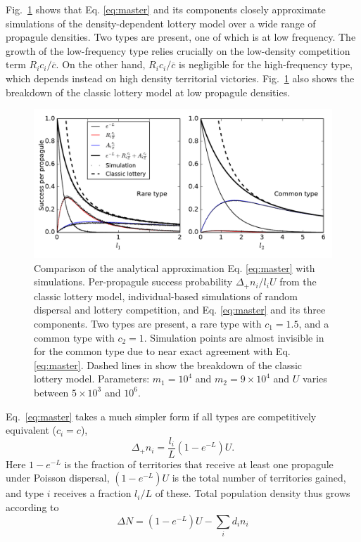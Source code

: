 \documentclass[11pt]{article}
\begin{document}
Fig.~\ref{fig:simcomp} shows that Eq. \eqref{eq:master} and its components closely approximate simulations of the density-dependent lottery model over a wide range of propagule densities. Two types are present, one of which is at low frequency. The growth of the low-frequency type relies crucially on the low-density competition term $R_i c_i/\overline{c}$. On the other hand, $R_i c_i/\overline{c}$ is negligible for the high-frequency type, which depends instead on high density territorial victories. Fig.~\ref{fig:simcomp} also shows the breakdown of the classic lottery model at low propagule densities.

\begin{figure}
\centering
\includegraphics[scale=0.8]{simulationcomparison.pdf}
\caption{\label{fig:simcomp} Comparison of the analytical approximation Eq. \eqref{eq:master} with simulations. Per-propagule success probability $\Delta_+ n_i/l_i U$ from the classic lottery model, individual-based simulations of random dispersal and lottery competition, and Eq. \eqref{eq:master} and its three components. Two types are present, a rare type with $c_1=1.5$, and a common type with $c_2=1$. Simulation points are almost invisible in for the common type due to near exact agreement with Eq. \eqref{eq:master}. Dashed lines in show the breakdown of the classic lottery model. Parameters: $m_1=10^4$ and $m_2=9\times 10^4$ and $U$ varies between $5\times 10^3$ and $10^6$.} 
\end{figure}

Eq.~\eqref{eq:master} takes a much simpler form if all types are competitively equivalent ($c_i=c$),
\begin{equation}
\Delta_+ n_i = \frac{l_i}{L}(1-e^{-L})U. \label{eq:masterequalc}
\end{equation}
Here $1-e^{-L}$ is the fraction of territories that receive at least one propagule under Poisson dispersal, $(1-e^{-L})U$ is the total number of territories gained, and type $i$ receives a fraction $l_i/L$ of these. Total population density thus grows according to
\begin{equation}
\Delta N=(1-e^{-L})U-\sum_i d_i n_i \label{eq:Nmaster}
\end{equation}
\end{document}
